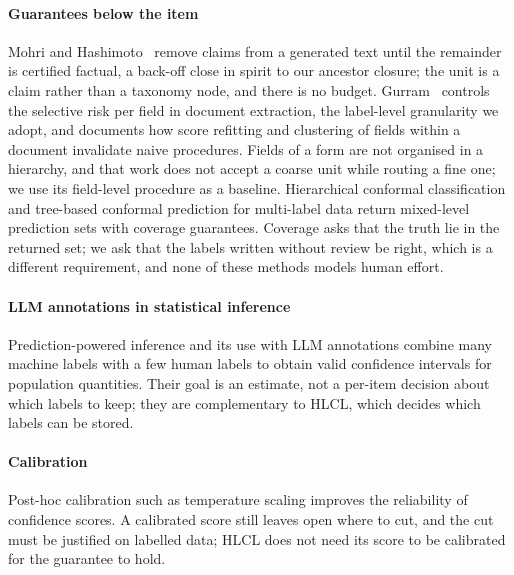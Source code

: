 \documentclass[preprint,12pt]{elsarticle}
\theoremstyle{definition}
\theoremstyle{remark}
\newcommand{\hlcl}{\textup{\textsc{HLCL}}}
\begin{document}
\paragraph{Guarantees below the item}
Mohri and Hashimoto~\cite{mohri2024language} remove claims from a generated text
until the remainder is certified factual, a back-off close in spirit to our
ancestor closure; the unit is a claim rather than a taxonomy node, and there is
no budget. Gurram~\cite{perfield2026} controls the selective risk per field in
document extraction, the label-level granularity we adopt, and documents how
score refitting and clustering of fields within a document invalidate naive
procedures. Fields of a form are not organised in a hierarchy, and that work
does not accept a coarse unit while routing a fine one; we use its field-level
procedure as a baseline. Hierarchical conformal classification
\cite{denhengst2025hierarchical,mortier2025conformal} and tree-based conformal
prediction for multi-label data \cite{tyagi2023multilabel} return mixed-level
prediction sets with coverage guarantees. Coverage asks that the truth lie in
the returned set; we ask that the labels written without review be right, which
is a different requirement, and none of these methods models human effort.

\paragraph{LLM annotations in statistical inference}
Prediction-powered inference \cite{angelopoulos2023ppi} and its use with LLM
annotations \cite{gligoric2025unconfident} combine many machine labels with a
few human labels to obtain valid confidence intervals for population quantities.
Their goal is an estimate, not a per-item decision about which labels to keep;
they are complementary to \hlcl{}, which decides which labels can be stored.

\paragraph{Calibration}
Post-hoc calibration such as temperature scaling \cite{guo2017calibration}
improves the reliability of confidence scores. A calibrated score still leaves
open where to cut, and the cut must be justified on labelled data; \hlcl{} does
not need its score to be calibrated for the guarantee to hold.
\end{document}
